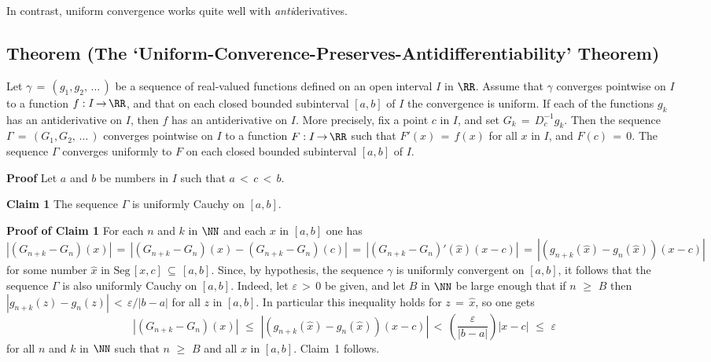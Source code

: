 \V
\V

        In contrast, uniform convergence works quite well with {\em anti}derivatives.

\V

            \subsection{\small{\bf Theorem} (The `Uniform-Converence-Preserves-Antidifferentiability' Theorem)}
            \label{ThmF05.90}

\V

    Let ${\gamma} \,=\, (g_{1},g_{2},\,{\ldots}\,)$ be a sequence of real-valued functions defined on an open interval $I$ in ${\RR}$.
     Assume that ${\gamma}$ converges pointwise on $I$ to a function $f:I \,{\rightarrow}\, {\RR}$, and that on each closed bounded subinterval $[a,b]$ of $I$ the convergence is uniform.
    If each of the functions $g_{k}$ has an antiderivative on $I$, then $f$ has an antiderivative on $I$.
    More precisely, fix a point $c$ in $I$, and set $G_{k} \,=\, D^{-1}_{c} g_{k}$.
    Then the sequence ${\Gamma} \,=\, (G_{1}, G_{2},\,{\ldots}\,)$ converges pointwise on $I$ to a function $F:I \,{\rightarrow}\, {\RR}$ such that $F'(x) \,=\, f(x)$ for all $x$ in $I$, and $F(c) \,=\, 0$.
    The sequence ${\Gamma}$ converges uniformly to $F$ on each closed bounded subinterval $[a,b]$ of $I$.

\V

        {\bf Proof} Let $a$ and $b$ be numbers in $I$ such that $a\,<\,c\,<\,b$.

        {\bf Claim 1} The sequence ${\Gamma}$ is uniformly Cauchy on $[a,b]$.

\V

        {\bf Proof of Claim 1} For each $n$ and $k$ in ${\NN}$ and each $x$ in $[a,b]$ one has
        \begin{displaymath}
        \left|(G_{n+k} - G_{n})(x)\right| \,=\, \left|(G_{n+k} - G_{n})(x) - (G_{n+k} - G_{n})(c)\right| \,=\, 
        \left|(G_{n+k} - G_{n})'(\hat{x})(x-c)\right| \,=\, 
        |(g_{n+k}(\hat{x}) - g_{n}(\hat{x}))(x-c)|
        \end{displaymath}
    for some number $\hat{x}$ in $\mbox{Seg}\,[x,c] \,{\subseteq}\, [a,b]$. Since, by hypothesis,
    the sequence ${\gamma}$ is uniformly convergent on $[a,b]$, it follows that the sequence ${\Gamma}$ is also uniformly Cauchy on $[a,b]$.
    Indeed, let ${\varepsilon}\,>\,0$ be given, and let $B$ in ${\NN}$ be large enough that
    if $n\,\,{\geq}\,\,B$ then $|g_{n+k}(z)-g_{n}(z)|\,<\,{\varepsilon}/|b-a|$ for all $z$ in $[a,b]$.
    In particular this inequality holds for $z \,=\, \hat{x}$, so one gets
        \begin{displaymath}
        \left|(G_{n+k} - G_{n})(x)\right|\,\,{\leq}\,\,|(g_{n+k}(\hat{x}) - g_{n}(\hat{x}))(x-c)|\,<\,\left(\frac{{\varepsilon}}{|b-a|}\right)|x-c|\,\,{\leq}\,\,{\varepsilon}
        \end{displaymath}
    for all $n$ and $k$ in ${\NN}$ such that $n\,\,{\geq}\,\,B$ and all $x$ in $[a,b]$.
    Claim~1 follows.

